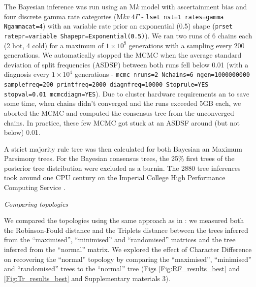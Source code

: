 \documentclass[12pt,letterpaper]{article}
\renewcommand{\subsection}[1]{%
\bigskip
\begin{center}
\begin{large}
\normalfont\itshape #1
\end{large}
\end{center}}
\begin{document}
The Bayesian inference was run using an M\textit{k} model with ascertainment bias and four discrete gamma rate categories (M\textit{kv} $4\Gamma$ - \texttt{lset nst=1 rates=gamma Ngammacat=4}) with an variable rate prior an exponential (0.5) shape (\texttt{prset ratepr=variable Shapepr=Exponential(0.5)}).
We ran two runs of 6 chains each (2 hot, 4 cold) for a maximum of $1\times10^9$ generations with a sampling every 200 generations.
We automatically stopped the MCMC when the average standard deviation of split frequencies (ASDSF) between both runs fell below 0.01 (with a diagnosis every $1\times10^4$ generations - \texttt{mcmc nruns=2 Nchains=6 ngen=1000000000 samplefreq=200 printfreq=2000 diagnfreq=10000 Stoprule=YES stopval=0.01 mcmcdiagn=YES}).
Due to cluster hardware requirements an to save some time, when chains didn't converged and the runs exceeded 5GB each, we aborted the MCMC and computed the consensus tree from the unconverged chains.
In practice, these few MCMC got stuck at an ASDSF around (but not below) 0.01.

A strict majority rule tree was then calculated for both Bayesian an Maximum Parsimony trees.
For the Bayesian consensus trees, the 25\% first trees of the posterior tree distribution were excluded as a burnin.
The 2880 tree inferences took around one CPU century on the Imperial College High Performance Computing Service \citep[2-3GHz clock rate;][]{HPC}.

\subsection{Comparing topologies}
We compared the topologies using the same approach as in \cite{Guillerme2016146}: we measured both the Robinson-Fould distance \citep{RF1981} and the Triplets distance \citep{dobson1975triplets} between the trees inferred from the ``maximised'', ``minimised'' and ``randomised'' matrices and the tree inferred from the ``normal'' matrix.
We explored the effect of Character Difference on recovering the ``normal'' topology by comparing the ``maximised'', ``minimised'' and ``randomised'' trees to the ``normal'' tree (Figs \ref{Fig:RF_results_best} and \ref{Fig:Tr_results_best} and Supplementary materials 3).
\end{document}

